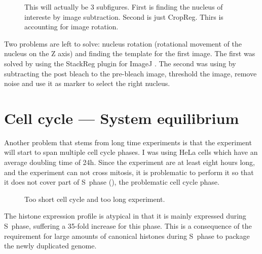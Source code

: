     \begin{figure}
      \centering
      \missingfigure{}
                   {This will actually be 3 subfigures. First is finding the nucleus of intereste by image subtraction.
                    Second is just CropReg. Thirs is accounting for image rotation.}
      \label{fig:cropreg}
    \end{figure}

    Two problems are left to solve: nucleus rotation (rotational movement of the nucleus on the
    Z axis) and finding the template for the first image. The first
    was solved by using the StackReg plugin for ImageJ
    . The second was using by subtracting the post bleach to the
    pre-bleach image, threshold the image, remove noise and use it as marker to select the right nucleus.


\section{Cell cycle --- System equilibrium}
\label{sec:frap-equilibrium}


  Another problem that stems from long time experiments is that the experiment will start to span
  multiple cell cycle phases. I was using HeLa cells which have an average doubling time of 24h.
  Since the experiment are at least eight hours long, and the experiment can not cross mitosis,
  it is problematic to perform it so that it does not cover part of S~phase (), the problematic cell
  cycle phase.
  
  \begin{figure}
    \centering
                 {Too short cell cycle and too long experiment.}
    \label{fig:cell-cycle-watch}
  \end{figure}
  
  The histone expression profile is atypical in that it is mainly expressed during S~phase, suffering
  a 35-fold increase for this phase. This is a consequence of the requirement for large amounts of
  canonical histones during S~phase to package the newly duplicated genome.
  
